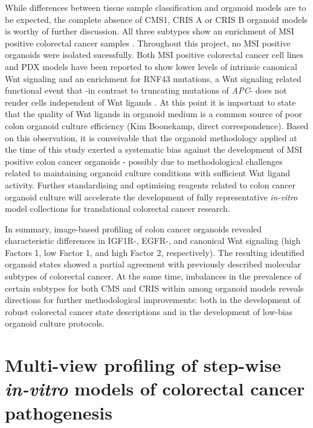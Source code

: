 \begin{flushleft}
While differences between tissue sample classification and organoid models are to be expected, the complete absence of CMS1, CRIS A or CRIS B organoid models is worthy of further discussion. All three subtypes show an enrichment of MSI positive colorectal cancer samples \citep{guinneyConsensusMolecularSubtypes2015, isellaSelectiveAnalysisCancercell2017a}. Throughout this project, no MSI positive organoids were isolated sucessfully. Both MSI positive colorectal cancer cell lines \citep{imkellerMetabolicBalanceColorectal2022} and PDX models \citep{isellaSelectiveAnalysisCancercell2017a} have been reported to show lower levels of intrinsic canonical Wnt signaling and an enrichment for RNF43 mutations, a Wnt signaling related functional event that -in contrast to truncating mutations of \textit{APC}- does not render cells independent of Wnt ligands \citep{vandeweteringProspectiveDerivationLiving2015}. At this point it is important to state that the quality of Wnt ligands in organoid medium is a common source of poor colon organoid culture efficiency (Kim Boonekamp, direct correspondence). Based on this observation, it is conveivable that the organoid methodology applied at the time of this study exerted a systematic bias against the development of MSI positive colon cancer organoids - possibly due to methodological challenges related to maintaining organoid culture conditions with sufficient Wnt ligand activity. Further standardising and optimising reagents related to colon cancer organoid culture will accelerate the development of fully representative \textit{in-vitro} model collections for translational colorectal cancer research. 
\par

In summary, image-based profiling of colon cancer organoids revealed characteristic differences in IGF1R-, EGFR-, and canonical Wnt signaling (high Factors 1, low Factor 1, and high Factor 2, respectively). The resulting identified organoid states showed a partial agreement with previously described molecular subtypes of colorectal cancer. At the same time, imbalances in the prevalence of certain subtypes for both CMS and CRIS within among organoid models reveals directions for further methodological improvements: both in the development of robust colorectal cancer state descriptions and in the development of low-bias organoid culture protocols. 

\section{Multi-view profiling of step-wise \textit{in-vitro} models of colorectal cancer pathogenesis}


\end{flushleft}
